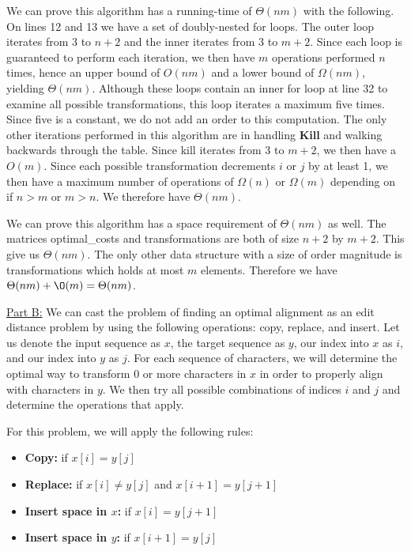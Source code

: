 \documentclass[11pt]{article}
\begin{document}
We can prove this algorithm has a running-time of $\Theta(nm)$ with the following. On lines 12 and 13 we have a set of doubly-nested for loops. The outer loop iterates from 3 to $n+2$ and the inner iterates from 3 to $m+2$. Since each loop is guaranteed to perform each iteration, we then have $m$ operations performed $n$ times, hence an upper bound of $O(nm)$ and a lower bound of $\Omega(nm)$, yielding $\Theta(nm)$. Although these loops contain an inner for loop at line 32 to examine all possible transformations, this loop iterates a maximum five times. Since five is a constant, we do not add an order to this computation. The only other iterations performed in this algorithm are in handling \textbf{Kill} and walking backwards through the table. Since kill iterates from 3 to $m+2$, we then have a $O(m)$. Since each possible transformation decrements $i$ or $j$ by at least 1, we then have a maximum number of operations of $\Omega(n)$ or $\Omega(m)$ depending on if $n > m$ or $m > n$. We therefore have $\Theta(nm)$.

We can prove this algorithm has a space requirement of $\Theta(nm)$ as well. The matrices optimal\_costs and transformations are both of size $n+2$ by $m+2$. This give us $\Theta(nm)$. The only other data structure with a size of order magnitude is transformations which holds at most $m$ elements. Therefore we have $\Theta(nm) + \O(m) = \Theta(nm)$.

\underline{Part B:} We can cast the problem of finding an optimal alignment as an edit distance problem by using the following operations: copy, replace, and insert. Let us denote the input sequence as $x$, the target sequence as $y$, our index into $x$ as $i$, and our index into $y$ as $j$. For each sequence of characters, we will determine the optimal way to transform 0 or more characters in $x$ in order to properly align with characters in $y$. We then try all possible combinations of indices $i$ and $j$ and determine the operations that apply.

For this problem, we will apply the following rules:

\begin{itemize}
  \item \textbf{Copy:} if $x[i] = y[j]$
  \item \textbf{Replace:} if $x[i] \neq y[j]$ and $x[i+1] = y[j+1]$
  \item \textbf{Insert space in $x$:} if $x[i] = y[j+1]$
  \item \textbf{Insert space in $y$:} if $x[i+1] = y[j]$
\end{itemize}
\end{document}

